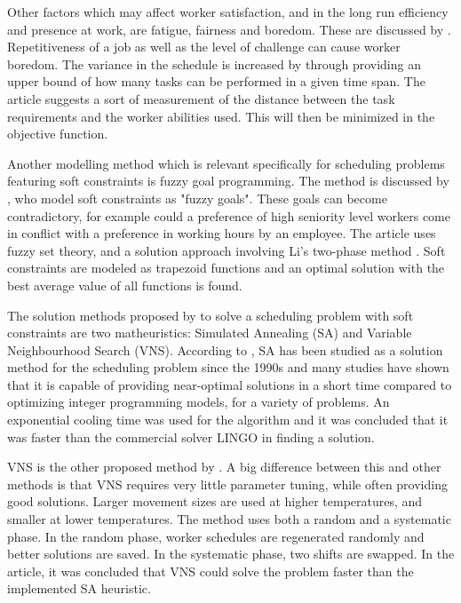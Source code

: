 Other factors which may affect worker satisfaction, and in the long run efficiency and presence at work, are fatigue, fairness and boredom. These are discussed by  \citet{eiselt_2008}. Repetitiveness of a job as well as the level of challenge can cause worker boredom. The variance in the schedule is increased by \citet{eiselt_2008} through providing an upper bound of how many tasks can be performed in a given time span. The article suggests a sort of measurement of the distance between the task requirements and the worker abilities used. This will then be minimized in the objective function.

Another modelling method which is relevant specifically for scheduling problems featuring soft constraints is fuzzy goal programming. The method is discussed by \citet{shahnazari_2013}, who model soft constraints as "fuzzy goals". These goals can become contradictory, for example could a preference of high seniority level workers come in conflict with a preference in working hours by an employee. The article uses fuzzy set theory, and a solution approach involving Li's two-phase method \citep{li_1990}. Soft constraints are modeled as trapezoid functions and an optimal solution with the best average value of all functions is found.

The solution methods proposed by \citet{akbari_2013} to solve a scheduling problem with soft constraints are two matheuristics: Simulated Annealing (SA) and Variable Neighbourhood Search (VNS). According to \citet{akbari_2013}, SA has been studied as a solution method for the scheduling problem since the 1990s and many studies have shown that it is capable of providing near-optimal solutions in a short time compared to optimizing integer programming models, for a variety of problems. An exponential cooling time was used for the algorithm and it was concluded that it was faster than the commercial solver LINGO in finding a solution.

VNS is the other proposed method by \citet{akbari_2013}. A big difference between this and other methods is that VNS requires very little parameter tuning, while often providing good solutions.
Larger movement sizes are used at higher temperatures, and smaller at lower temperatures. The method uses both a random and a systematic phase. In the random phase, worker schedules are regenerated randomly and better solutions are saved. In the systematic phase, two shifts are swapped. In the article, it was concluded that VNS could solve the problem faster than the implemented SA heuristic.


